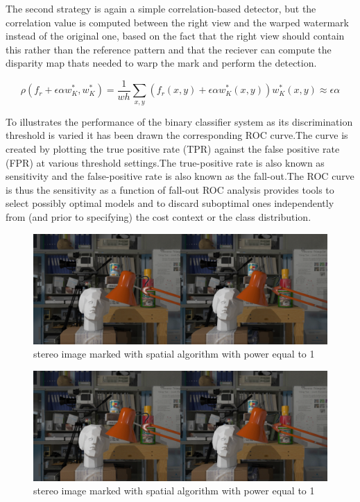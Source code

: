 The second strategy is again a simple correlation-based detector, but the correlation value is computed between the right view and the warped watermark instead of the original one, based on the fact that the right view should contain this rather than the reference pattern and that the reciever can compute the disparity map thats needed to warp the mark and perform the detection.

$$\rho(f_{r}+\epsilon\alpha w_{K}^{*},w_{K}^{*})= \frac{1}{wh}\sum_{x,y}(f_{r}(x,y)+\epsilon\alpha w_{K}^{*}(x,y))w_{K}^{*}(x,y)\approx\epsilon\alpha $$

To illustrates the performance of the binary classifier system as its discrimination threshold is varied it has been drawn the corresponding ROC curve.\newline  The curve is created by plotting the true positive rate (TPR) against the false positive rate (FPR) at various threshold settings.\newline The true-positive rate is also known as sensitivity and the false-positive rate is also known as the fall-out.\newline  The ROC curve is thus the sensitivity as a function of fall-out ROC analysis provides tools to select possibly optimal models and to discard suboptimal ones independently from (and prior to specifying) the cost context or the class distribution.\newline 

\begin{figure}[h!]
\centering
\includegraphics[width=1\textwidth]{./img/marked_1_gauss.png}
\caption{\small{stereo image marked with spatial algorithm with power equal to 1}}
\label{fig:gauss1}
\end{figure}
\begin{figure}[h!]
\centering
\includegraphics[width=1\textwidth]{./img/marked_3_gauss.png}
\caption{\small{stereo image marked with spatial algorithm with power equal to 1}}
\label{fig:gauss3}
\end{figure}
  
